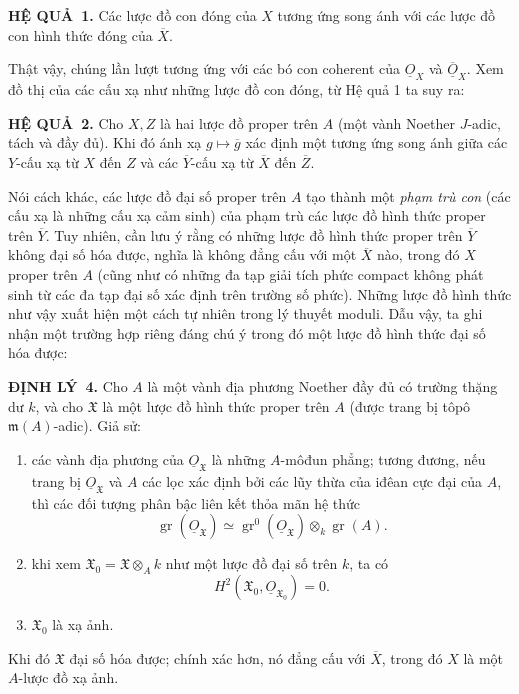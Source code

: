 \documentclass[11pt,twoside,openany]{book}
\numberwithin{equation}{section}
\newcommand{\Osh}{\underline{O}}
\newcommand{\fquote}[1]{\textquotedbl#1\textquotedbl}
\newcommand{\result}[2]{\par\medskip\noindent\textbf{#1\if\relax\detokenize{#2}\relax\else\ #2\fi.}\quad}
\begin{document}
\result{HỆ QUẢ}{1} Các lược đồ con đóng của $X$ tương ứng song ánh với các
lược đồ con hình thức đóng của $\overline X$.

Thật vậy, chúng lần lượt tương ứng với các bó con coherent của $\Osh_X$ và
$\overline{\Osh}_X$. Xem đồ thị của các cấu xạ như những lược đồ con đóng, từ
Hệ quả 1 ta suy ra:

\result{HỆ QUẢ}{2} Cho $X,Z$ là hai lược đồ proper trên $A$ (một vành Noether
$J$-adic, tách và đầy đủ). Khi đó ánh xạ
$g\longmapsto\overline g$ xác định một tương ứng song ánh giữa các $Y$-cấu xạ
từ $X$ đến $Z$ và các $\overline Y$-cấu xạ từ $\overline X$ đến
$\overline Z$.

Nói cách khác, các lược đồ đại số proper trên $A$ tạo thành một
\emph{phạm trù con} (các cấu xạ là những cấu xạ cảm sinh) của phạm trù các
lược đồ hình thức proper trên $\overline Y$. Tuy nhiên, cần lưu ý rằng có những
lược đồ hình thức proper trên $\overline Y$ không \fquote{đại số hóa được},
nghĩa là không đẳng cấu với một $\overline X$ nào, trong đó $X$ proper trên
$A$ (cũng như có những đa tạp giải tích phức compact không phát sinh từ các đa
tạp đại số xác định trên trường số phức). Những lược đồ hình thức như vậy xuất
hiện một cách tự nhiên trong \fquote{lý thuyết moduli}. Dẫu vậy, ta ghi nhận
một trường hợp riêng đáng chú ý trong đó một lược đồ hình thức đại số hóa được:

\result{ĐỊNH LÝ}{4} Cho $A$ là một vành địa phương Noether đầy đủ có trường
thặng dư $k$, và cho $\mathfrak X$ là một lược đồ hình thức proper trên $A$
(được trang bị tôpô $\mathfrak m(A)$-adic). Giả sử:
\begin{enumerate}
  \item[\textit{i.}] các vành địa phương của $\Osh_{\mathfrak X}$ là những
    $A$-môđun phẳng; tương đương, nếu trang bị $\Osh_{\mathfrak X}$ và $A$
    các lọc xác định bởi các lũy thừa của iđêan cực đại của $A$, thì các đối
    tượng phân bậc liên kết thỏa mãn hệ thức
    \[
      \operatorname{gr}(\Osh_{\mathfrak X})
      \simeq
      \operatorname{gr}^{0}(\Osh_{\mathfrak X})
      \otimes_k\operatorname{gr}(A).
    \]
  \item[\textit{ii.}] khi xem
    $\mathfrak X_0=\mathfrak X\otimes_A k$ như một lược đồ đại số trên $k$,
    ta có
    \[
      H^2(\mathfrak X_0,\Osh_{\mathfrak X_0})=0.
    \]
  \item[\textit{iii.}] $\mathfrak X_0$ là xạ ảnh.
\end{enumerate}
Khi đó $\mathfrak X$ đại số hóa được; chính xác hơn, nó đẳng cấu với
$\overline X$, trong đó $X$ là một $A$-lược đồ xạ ảnh.
\end{document}
